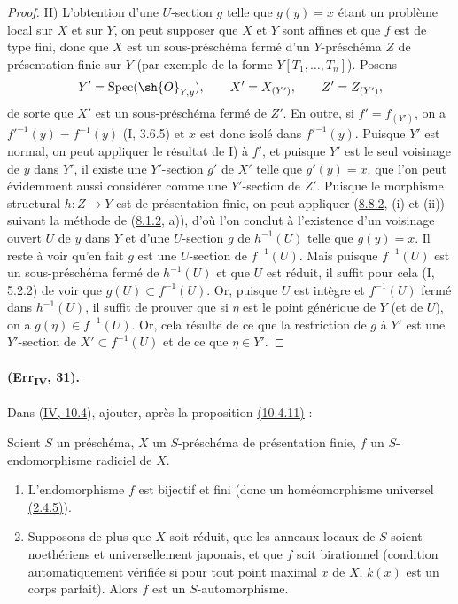 \begin{proof}
\textup{II)} L'obtention d'une $U$-section $g$ telle que $g(y)=x$ étant
un problème local sur $X$ et sur $Y$, on peut supposer que $X$ et $Y$
sont affines et que $f$ est de type fini, donc que $X$ est un
sous-préschéma fermé d'un $Y$-préschéma $Z$ de présentation finie sur
$Y$ (par exemple de la forme $Y[T_1,\ldots,T_n]$). Posons
\[
 Y'=\operatorname{Spec}(\sh{O}_{Y,y}),\qquad
 X'=X_{(Y')},\qquad Z'=Z_{(Y')},
\]
de sorte que $X'$ est un sous-préschéma fermé de $Z'$. En outre, si
$f'=f_{(Y')}$, on a $f'^{-1}(y)=f^{-1}(y)$ (I, 3.6.5) et $x$ est donc
isolé dans $f'^{-1}(y)$. Puisque $Y'$ est normal, on peut appliquer le
résultat de I) à $f'$, et puisque $Y'$ est le seul voisinage de $y$ dans
$Y'$, il existe une $Y'$-section $g'$ de $X'$ telle que $g'(y)=x$, que
l'on peut évidemment aussi considérer comme une $Y'$-section de $Z'$.
Puisque le morphisme structural $h:Z\to Y$ est de présentation finie,
on peut appliquer ({\hyperlink{ega4.c04.thm.8-8-2}{8.8.2}}, (i) et
(ii)) suivant la méthode de
({\hyperlink{ega4.c04.statement.8-1-2}{8.1.2}}, a)), d'où l'on conclut
à l'existence d'un voisinage ouvert $U$ de $y$ dans $Y$ et d'une
$U$-section $g$ de $h^{-1}(U)$ telle que $g(y)=x$. Il reste à voir
qu'en fait $g$ est une $U$-section de $f^{-1}(U)$. Mais puisque
$f^{-1}(U)$ est un sous-préschéma fermé de $h^{-1}(U)$ et que $U$ est
réduit, il suffit pour cela (I, 5.2.2) de voir que
$g(U)\subset f^{-1}(U)$. Or, puisque $U$ est intègre et $f^{-1}(U)$
fermé dans $h^{-1}(U)$, il suffit de prouver que si $\eta$ est le point
générique de $Y$ (et de $U$), on a $g(\eta)\in f^{-1}(U)$. Or, cela
résulte de ce que la restriction de $g$ à $Y'$ est une $Y'$-section de
$X'\subset f^{-1}(U)$ et de ce que $\eta\in Y'$.
\end{proof}

\paragraph{(Err\textsubscript{IV}, 31).}
Dans ({\hyperlink{ega4.c04.subsec.10-4}{IV, 10.4}}), ajouter, après la
proposition {\hyperlink{ega4.c04.statement.10-4-11}{(10.4.11)}} :

\begin{corollary}[10.4.12]
\label{IV.10.4.12}
Soient $S$ un préschéma, $X$ un $S$-préschéma de présentation finie,
$f$ un $S$-endomorphisme radiciel de $X$.
\begin{enumerate}[label=\textup{(\roman*)}]
\item L'endomorphisme $f$ est bijectif et fini (donc un homéomorphisme
universel {\hyperlink{ega4.c04.prop.2-4-5}{(2.4.5)}}).
\item Supposons de plus que $X$ soit réduit, que les anneaux locaux de
$S$ soient noethériens et universellement japonais, et que $f$ soit
birationnel (condition automatiquement vérifiée si pour tout point
maximal $x$ de $X$, $k(x)$ est un corps parfait). Alors $f$ est un
$S$-automorphisme.
\end{enumerate}
\end{corollary}

